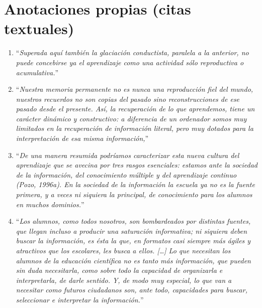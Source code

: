 \documentclass{article}
\begin{document}
\tableofcontents  \vspace{2cm}

\section{Anotaciones propias (citas textuales)}
\begin{enumerate}[label=\textbf{\arabic*.}, leftmargin=*, itemsep=8pt]

  \item “\emph{Superada aquí también la glaciación conductista, paralela a la anterior, no puede concebirse ya el aprendizaje como una actividad sólo reproductiva o acumulativa.}”

  \item “\emph{Nuestra memoria permanente no es nunca una reproducción fiel del mundo, nuestros recuerdos no son copias del pasado sino reconstrucciones de ese pasado desde el presente. Así, la recuperación de lo que aprendemos, tiene un carácter dinámico y constructivo: a diferencia de un ordenador somos muy limitados en la recuperación de información literal, pero muy dotados para la interpretación de esa misma información,}”

  \item “\emph{De una manera resumida podríamos caracterizar esta nueva cultura del aprendizaje que se avecina por tres rasgos esenciales: estamos ante la sociedad de la información, del conocimiento múltiple y del aprendizaje continuo (Pozo, 1996a). En la sociedad de la información la escuela ya no es la fuente primera, y a veces ni siquiera la principal, de conocimiento para los alumnos en muchos dominios.}”

  \item “\emph{Los alumnos, como todos nosotros, son bombardeados por distintas fuentes, que llegan incluso a producir una saturación informativa; ni siquiera deben buscar la información, es ésta la que, en formatos casi siempre más ágiles y atractivos que los escolares, les busca a ellos. […] Lo que necesitan los alumnos de la educación científica no es tanto más información, que pueden sin duda necesitarla, como sobre todo la capacidad de organizarla e interpretarla, de darle sentido. Y, de modo muy especial, lo que van a necesitar como futuros ciudadanos son, ante todo, capacidades para buscar, seleccionar e interpretar la información.}”


\end{enumerate}
\end{document}
